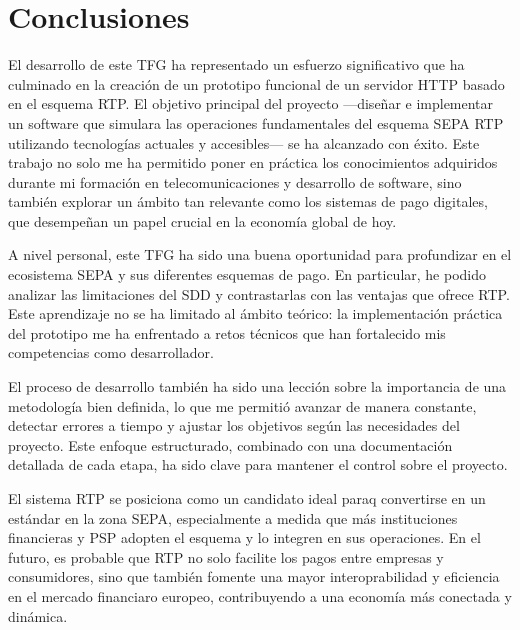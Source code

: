 \section{Conclusiones}
\label{sec:Conclusiones}

El desarrollo de este TFG ha representado un esfuerzo significativo que ha culminado en la creación de un prototipo funcional de un servidor HTTP basado en el esquema RTP. El objetivo principal del proyecto —diseñar e implementar un software que simulara las operaciones fundamentales del esquema SEPA RTP utilizando tecnologías actuales y accesibles— se ha alcanzado con éxito. Este trabajo no solo me ha permitido poner en práctica los conocimientos adquiridos durante mi formación en telecomunicaciones y desarrollo de software, sino también explorar un ámbito tan relevante como los sistemas de pago digitales, que desempeñan un papel crucial en la economía global de hoy.

\vspace{0.5cm}

A nivel personal, este TFG ha sido una buena oportunidad para profundizar en el ecosistema SEPA y sus diferentes esquemas de pago. En particular, he podido analizar las limitaciones del SDD y contrastarlas con las ventajas que ofrece RTP. Este aprendizaje no se ha limitado al ámbito teórico: la implementación práctica del prototipo me ha enfrentado a retos técnicos que han fortalecido mis competencias como desarrollador.

\vspace{0.5cm}

El proceso de desarrollo también ha sido una lección sobre la importancia de una metodología bien definida, lo que me permitió avanzar de manera constante, detectar errores a tiempo y ajustar los objetivos según las necesidades del proyecto. Este enfoque estructurado, combinado con una documentación detallada de cada etapa, ha sido clave para mantener el control sobre el proyecto.
\vspace{0.5cm}


El sistema RTP se posiciona como un candidato ideal paraq convertirse en un estándar en la zona SEPA, especialmente a medida que más instituciones financieras y PSP adopten el esquema y lo integren en sus operaciones. En el futuro, es probable que RTP no solo facilite los pagos entre empresas y consumidores, sino que también fomente una mayor interoprabilidad y eficiencia en el mercado financiaro europeo, contribuyendo a una economía más conectada y dinámica.
\vspace{0.5cm}

